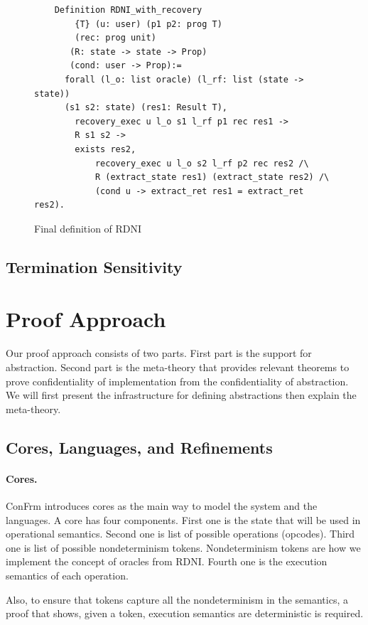 \begin{figure}[ht]
    \centering
    \begin{verbatim}
    Definition RDNI_with_recovery
        {T} (u: user) (p1 p2: prog T) 
        (rec: prog unit)
       (R: state -> state -> Prop) 
       (cond: user -> Prop):=
      forall (l_o: list oracle) (l_rf: list (state -> state))
      (s1 s2: state) (res1: Result T),
        recovery_exec u l_o s1 l_rf p1 rec res1 ->
        R s1 s2 ->
        exists res2,
            recovery_exec u l_o s2 l_rf p2 rec res2 /\
            R (extract_state res1) (extract_state res2) /\
            (cond u -> extract_ret res1 = extract_ret res2).
    \end{verbatim}
    \caption{Final definition of RDNI}
    \label{fig:RDNI_final}
\end{figure}

{\color{red}
\subsection{Termination Sensitivity}}

\section{Proof Approach}
Our proof approach consists of two parts. First part is the support for abstraction. Second part is the meta-theory that provides relevant theorems to prove confidentiality of implementation from the confidentiality of abstraction. We will first present the infrastructure for defining abstractions then explain the meta-theory.

\subsection{Cores, Languages, and Refinements}
\paragraph{Cores.}
ConFrm introduces cores as the main way to model the system and the languages. A core has four components. First one is the state that will be used in operational semantics. Second one is list of possible operations (opcodes). Third one is list of possible nondeterminism tokens. Nondeterminism tokens are how we implement the concept of oracles from RDNI. Fourth one is the execution semantics of each operation.

Also, to ensure that tokens capture all the nondeterminism in the semantics, a proof that shows, given a token, execution semantics are deterministic is required.

